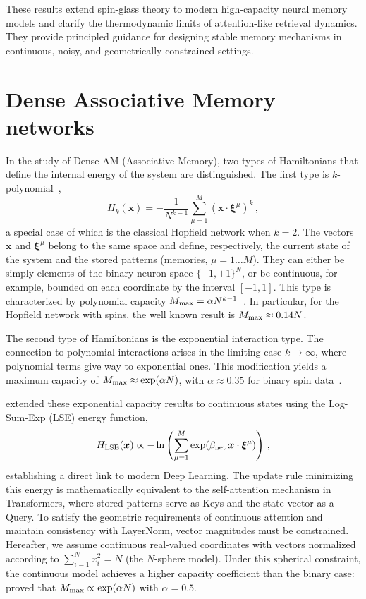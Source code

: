 \documentclass{article}
\theoremstyle{plain}
\theoremstyle{definition}
\theoremstyle{remark}
\begin{document}
These results extend spin-glass theory to modern high-capacity neural memory models and clarify the thermodynamic limits of attention-like retrieval dynamics. They provide principled guidance for designing stable memory mechanisms in continuous, noisy, and geometrically constrained settings.






\section{Dense Associative Memory networks}

In the study of Dense AM (Associative Memory), two types of Hamiltonians that define the internal energy of the system are distinguished. The first type is $k$-polynomial~\cite{krotov2016dense}, 
\begin{equation}
    H_k(\bm{x}) = - \frac{1}{N^{k-1}} \sum\limits_{\mu=1}^{M} (\bm{x} \cdot \bm{\xi}^\mu)^k\,,
    \label{eq:H_k}
\end{equation}
a special case of which is the classical Hopfield network \cite{Hopfield1982} when $k=2$. 
The vectors $\bm{x}$ and $\bm{\xi}^\mu$ belong to the same space and define, respectively, the current state of the system and the stored patterns (memories, $\mu=1\dots M$). They can either be simply elements of the binary neuron space $\{-1,+1\}^N$, or be continuous, for example, bounded on each coordinate by the interval $[-1, 1]$. This type is characterized by polynomial capacity $M_{\rm max} = \alpha N^{k-1}$~\cite{krotov2016dense}. In particular, for the Hopfield network with spins, the well known result is $M_{\rm max} \approx 0.14N$.

The second type of Hamiltonians is the exponential interaction type. The connection to polynomial interactions arises in the limiting case $k \to \infty$, where polynomial terms give way to exponential ones. This modification yields a maximum capacity of $M_{\rm max} \approx \exp(\alpha N)$, with $\alpha \approx 0.35$ for binary spin data~\cite{demircigil2017model}.

\citet{ramsauer2021hopfield} extended these exponential capacity results to continuous states using the Log-Sum-Exp (LSE) energy function, 
\begin{equation}
    H_{\rm LSE}(\bm{x}) \propto -\ln \left( \sum_{\mu=1}^M \exp(\beta_{\rm net} \, \bm{x} \cdot \bm{\xi}^\mu) \right) \,,
    \label{eq:lse_energy}
\end{equation}
establishing a direct link to modern Deep Learning.
The update rule minimizing this energy is mathematically equivalent to the self-attention mechanism in Transformers, where stored patterns serve as Keys and the state vector as a Query. To satisfy the geometric requirements of continuous attention and maintain consistency with LayerNorm, vector magnitudes must be constrained. Hereafter, we assume continuous real-valued coordinates with vectors normalized according to $\sum_{i=1}^{N} x_i^2 = N$ (the $N$-sphere model). Under this spherical constraint, the continuous model achieves a higher capacity coefficient than the binary case: \citet{ramsauer2021hopfield} proved that $M_{\rm max} \propto \exp(\alpha N)$ with $\alpha = 0.5$.
\end{document}
